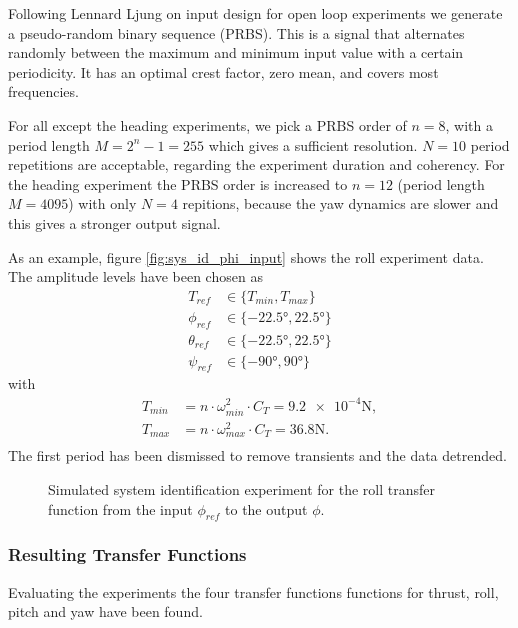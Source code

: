 Following Lennard Ljung on input design for open loop experiments \cite{ljung1999system} we generate a pseudo-random binary sequence (PRBS). This is a signal that alternates randomly between the maximum and minimum input value with a certain periodicity. It has an optimal crest factor, zero mean, and covers most frequencies. 

For all except the heading experiments, we pick a PRBS order of $n=8$, with a period length $M = 2^n-1 = 255$ which gives a sufficient resolution. $N = 10$ period repetitions are acceptable, regarding the experiment duration and coherency. For the heading experiment the PRBS order is increased to $n=12$ (period length $M=4095$) with only $N =4$ repitions, because the yaw dynamics are slower and this gives a stronger output signal.

As an example, figure \ref{fig:sys_id_phi_input} shows the roll experiment data. The amplitude levels have been chosen as
\begin{align}
T_{ref} &\in \{T_{min},T_{max}\} \\
\phi_{ref} &\in \{-22.5\si{\degree},22.5\si{\degree}\} \\
\theta_{ref} &\in \{-22.5\si{\degree},22.5\si{\degree}\} \\
\psi_{ref} &\in \{-90\si{\degree},90\si{\degree}\}
\end{align}
with
\begin{align}
T_{min} &= n \cdot \omega_{min}^2 \cdot C_T =  \num{9.2e-4} \si{\newton} ,\\
T_{max} &= n \cdot \omega_{max}^2 \cdot C_T =  \num{36.8}\si{\newton} .\\
\end{align}
The first period has been dismissed to remove transients and the data detrended.

\begin{figure}
\centering
{}
\qquad
{}
\caption[Simulated system identification experiment]{Simulated system identification experiment for the roll transfer function from the input $\phi_{ref}$ to the output $\phi$.}
\label{fig:sys_id_phi}
\end{figure}

\subsubsection{Resulting Transfer Functions}
Evaluating the experiments the four transfer functions functions for thrust, roll, pitch and yaw have been found.

